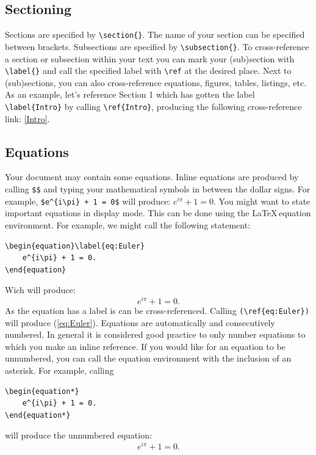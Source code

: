 \documentclass{amsart}
\theoremstyle{plain}
\begin{document}
\subsection{Sectioning}\label{Subsec}
Sections are specified by \verb|\section{}|.
The name of your section can be specified between brackets.
Subsections are specified by \verb|\subsection{}|.
To cross-reference a section or subsection within your text you can mark your (sub)section with \verb|\label{}| and call the specified label with \verb|\ref| at the desired place.
Next to (sub)sections, you can also cross-reference equations, figures, tables, listings, etc.
As an example, let's reference Section 1 which has gotten the label \verb|\label{Intro}| by calling \verb|\ref{Intro}|, producing the following cross-reference link: \ref{Intro}.


\subsection{Equations}\label{Equations}
Your document may contain some equations.
Inline equations are produced by calling \verb|$$| and typing your mathematical symbols in between the dollar signs.
For example, \verb|$e^{i\pi} + 1 = 0$| will produce: $e^{i\pi} + 1 = 0$.
You might want to state important equations in display mode.
This can be done using the \LaTeX \,equation environment.
For example, we might call the following statement:
\begin{verbatim}
\begin{equation}\label{eq:Euler}
    e^{i\pi} + 1 = 0.
\end{equation}
\end{verbatim}
Wich will produce:
\begin{equation}\label{eq:Euler}
    e^{i\pi} + 1 = 0.
\end{equation}
As the equation has a label is can be cross-referenced.
Calling \verb|(\ref{eq:Euler})| will produce (\ref{eq:Euler}).
Equations are automatically and consecutively numbered.
In general it is considered good practice to only number equations to which you make an inline reference.
If you would like for an equation to be unnumbered, you can call the equation environment with the inclusion of an asterisk.
For example, calling
\begin{verbatim}
\begin{equation*}
    e^{i\pi} + 1 = 0.
\end{equation*}
\end{verbatim}
will produce the unnumbered equation:
\begin{equation*}
    e^{i\pi} + 1 = 0.
\end{equation*}
\end{document}
